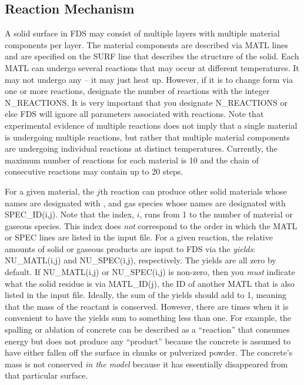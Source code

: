 \documentclass[11pt]{book}
\begin{document}
\subsection{Reaction Mechanism}

A solid surface in FDS may consist of multiple layers with multiple material
components per layer. The material components are described via {\ct MATL} lines and are specified on the {\ct SURF}
line that describes the structure of the solid.  Each {\ct MATL} can undergo several reactions that may
occur at different temperatures. It may not undergo any -- it may just heat
up. However, if it is to change form via one or more reactions,
designate the number of reactions with the integer {\ct N\_REACTIONS}. It is very important that you designate {\ct N\_REACTIONS}
or else FDS will ignore all parameters associated with
reactions. Note that experimental evidence of multiple
reactions does not imply that a single material is undergoing multiple reactions, but rather that
multiple material components are undergoing individual reactions at distinct temperatures.  Currently, the maximum number of
reactions for each material is 10 and the chain of consecutive
reactions may contain up to 20 steps.

For a given material, the $j$th reaction can produce other solid materials whose names are designated with , and gas
species whose names are designated with {\ct SPEC\_ID(i,j)}. Note that the index, $i$, runs from 1 to the number of material or gaseous species. This index
does {\em not} correspond to the order in which the {\ct MATL} or {\ct SPEC} lines are listed in the input file.
For a given reaction, the relative amounts of solid or gaseous products are input
to FDS via the {\em yields}: {\ct NU\_MATL(i,j)} and {\ct NU\_SPEC(i,j)}, respectively.
The yields are all zero by default. If {\ct NU\_MATL(i,j)} or {\ct NU\_SPEC(i,j)} is non-zero, then you {\em must} indicate what the
solid residue is via {\ct MATL\_ID(j)}, the {\ct ID} of another {\ct MATL} that is also listed in the input file. Ideally, the sum of the
yields should add to 1, meaning that the mass of the reactant is
conserved. However, there are times when it is convenient to have the
yields sum to something less than one. For example, the spalling or
ablation of concrete can be described as a ``reaction'' that consumes
energy but does not produce any ``product'' because the concrete is
assumed to have either fallen off the surface in chunks or pulverized
powder. The concrete's mass is not conserved {\em in the model}
because it has essentially disappeared from that particular surface.
\end{document}

